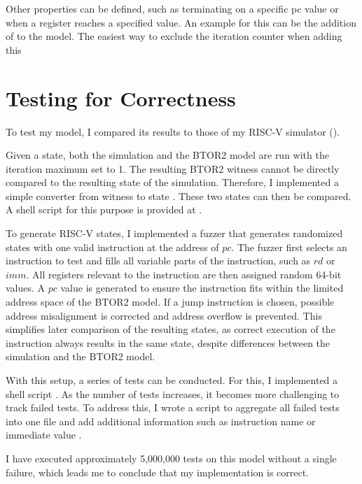 Other properties can be defined, such as terminating on a specific pc
value or when a register reaches a specified value. An example for
this can be the addition of  to the model. The
easiest way to exclude the iteration counter when adding this






\section{Testing for Correctness}\label{sec:corectness}
To test my model, I compared its results to those of my RISC-V
simulator ().

Given a state, both the simulation and the BTOR2 model are run with
the iteration maximum set to 1. The resulting BTOR2 witness cannot be
directly compared to the resulting state of the simulation.
Therefore, I implemented a simple converter from witness to state
\cite[src/restate\_witness.c]{repoRV2BTOR}. These two states can then
be compared. A shell script for this purpose is provided at
\cite[sh\_utils/compare\_iterations.sh]{repoRV2BTOR}.

To generate RISC-V states, I implemented a fuzzer
\cite[src/state\_fuzzer.c]{repoRV2BTOR} that generates randomized
states with one valid instruction at the address of $pc$. The fuzzer
first selects an instruction to test and fills all variable parts of
the instruction, such as $rd$ or $imm$. All registers relevant to the
instruction are then assigned random 64-bit values. A $pc$ value is
generated to ensure the instruction fits within the limited address
space of the BTOR2 model. If a jump instruction is chosen, possible
address misalignment is corrected and address overflow is prevented.
This simplifies later comparison of the resulting states, as correct
execution of the instruction always results in the same state,
despite differences between the simulation and the BTOR2 model.

With this setup, a series of tests can be conducted. For this, I
implemented a shell script
\cite[sh\_utils/test\_btor2\_model.sh]{repoRV2BTOR}. As the number of
tests increases, it becomes more challenging to track failed tests.
To address this, I wrote a script to aggregate all failed tests into
one file and add additional information such as instruction name or
immediate value \cite[sh\_utils/diff\_logger.sh]{repoRV2BTOR}.

I have executed approximately 5,000,000 tests on this model without a
single failure, which leads me to conclude that my implementation is
correct.
